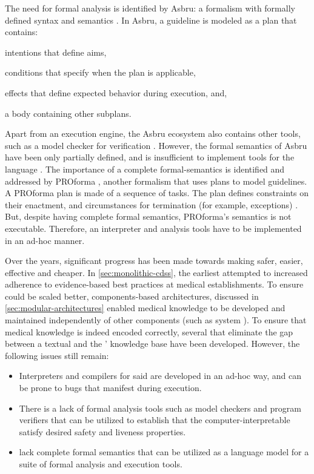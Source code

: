 The need for formal analysis is identified by Asbru: a formalism with formally
defined syntax and semantics \cite{ShaharAMIA96}. In Asbru, a guideline is modeled as a plan
that contains:
\begin{enumerate*}[label=(\roman*)]
  \item intentions that define aims,
  \item conditions that specify when the plan is applicable,
  \item effects that define expected behavior during execution, and,
  \item a body containing other subplans.
\end{enumerate*}
Apart from an execution engine, the Asbru ecosystem also contains
other tools, such as a model checker for verification \cite{BaumlerSPIN06}.
However, the formal semantics of Asbru have been only partially defined, and
is insufficient to implement tools for the language \cite{SuttonAMIA03}.
The importance of a complete formal-semantics is identified and addressed
by PROforma \cite{SuttonAMIA03}, another formalism that uses plans to
model guidelines. A PROforma plan is made of a sequence of tasks.
The plan defines constraints on their enactment, and circumstances
for termination (for example, exceptions) \cite{SuttonAMIA03}. But, despite
having complete formal semantics, PROforma's semantics is not executable.
Therefore, an interpreter and analysis tools have to be implemented in an
ad-hoc manner.

Over the years, significant progress has been made towards making \CDSSs{}
safer, easier, effective and cheaper. In \autoref{sec:monolithic-cdss},
the earliest \CDSSs{} attempted to increased adherence to evidence-based best practices
at medical establishments. To ensure \CDSSs{} could be scaled better,
components-based architectures, discussed in
\autoref{sec:modular-architectures} enabled medical knowledge to
be developed and maintained independently of other components (such as system
\UI{}). To ensure that medical knowledge is indeed encoded correctly,
several \DSLs{} that eliminate the gap between a textual \BPG{} and
the \CDSS{}' knowledge base have been developed. However,
the following issues still remain:
\begin{itemize}
  \item Interpreters and compilers for said \DSLs{} are developed in an
    ad-hoc way, and can be prone to bugs that manifest during execution.
  \item There is a lack of formal analysis tools such as model checkers and
    program verifiers that can be utilized to establish that the
    computer-interpretable \BPGs{} satisfy desired safety and liveness
    properties.
  \item \DSLs{} lack complete formal semantics that can be utilized
    as a language model for a suite of formal analysis and execution tools.
\end{itemize}

